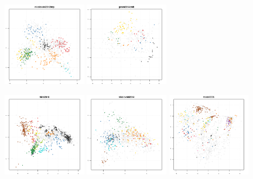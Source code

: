 \documentclass[12pt]{article}\usepackage[]{graphicx}\usepackage[]{color}
\begin{document}
\begin{appendices}
\begin{figure}[htb]
  \includegraphics[width = 0.32\textwidth]{./figure/figpca-23.pdf}
  \includegraphics[width = 0.32\textwidth]{./figure/figpca-24.pdf}
\end{figure}
\begin{figure}[htb]\ContinuedFloat
  \includegraphics[width = 0.32\textwidth]{./figure/figpca-25.pdf}
  \includegraphics[width = 0.32\textwidth]{./figure/figpca-26.pdf}
  \includegraphics[width = 0.32\textwidth]{./figure/figpca-27.pdf}

\end{figure}
\end{appendices}
\end{document}
